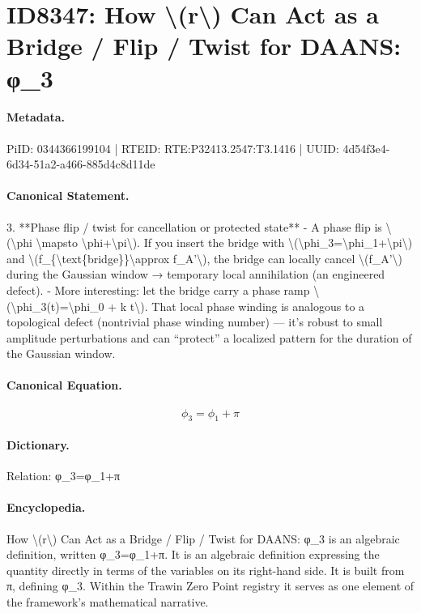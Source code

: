 \section*{ID8347: How \textbackslash{}(r\textbackslash{}) Can Act as a Bridge / Flip / Twist for DAANS: φ\_3}
\paragraph{Metadata.}
PiID: 0344366199104 | RTEID: RTE:P32413.2547:T3.1416 | UUID: 4d54f3e4-6d34-51a2-a466-885d4c8d11de

\paragraph{Canonical Statement.}
3. **Phase flip / twist for cancellation or protected state** - A phase flip is \textbackslash{}(\textbackslash{}phi \textbackslash{}mapsto \textbackslash{}phi+\textbackslash{}pi\textbackslash{}). If you insert the bridge with \textbackslash{}(\textbackslash{}phi\_3=\textbackslash{}phi\_1+\textbackslash{}pi\textbackslash{}) and \textbackslash{}(f\_\{\textbackslash{}text\{bridge\}\}\textbackslash{}approx f\_A'\textbackslash{}), the bridge can locally cancel \textbackslash{}(f\_A'\textbackslash{}) during the Gaussian window → temporary local annihilation (an engineered defect). - More interesting: let the bridge carry a phase ramp \textbackslash{}(\textbackslash{}phi\_3(t)=\textbackslash{}phi\_0 + k t\textbackslash{}). That local phase winding is analogous to a topological defect (nontrivial phase winding number) — it’s robust to small amplitude perturbations and can “protect” a localized pattern for the duration of the Gaussian window.

\paragraph{Canonical Equation.}
\[
\phi_3=\phi_1+\pi
\]

\paragraph{Dictionary.}
Relation: φ\_3=φ\_1+π

\paragraph{Encyclopedia.}
How \textbackslash{}(r\textbackslash{}) Can Act as a Bridge / Flip / Twist for DAANS: φ\_3 is an algebraic definition, written φ\_3=φ\_1+π. It is an algebraic definition expressing the quantity directly in terms of the variables on its right-hand side. It is built from π, defining φ\_3. Within the Trawin Zero Point registry it serves as one element of the framework's mathematical narrative.
